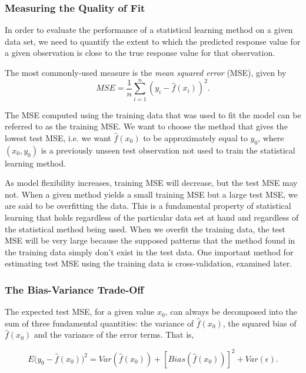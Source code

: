 \documentclass{article}
\numberwithin{equation}{section}
\begin{document}
\subsubsection{Measuring the Quality of Fit}
In order to evaluate the performance of a statistical learning method on a given data set, we need to quantify the extent to which the predicted response value for a given observation is close to the true response value for that observation.

The most commonly-used measure is the \textit{mean squared error} (MSE), given by
\begin{equation}
    MSE = \frac{1}{n} \sum_{i=1}^n (y_i - \hat f(x_i))^2.
\end{equation}

The MSE computed using the training data that was used to fit the model can be referred to as the training
MSE. We want to choose the method that gives
the lowest test MSE, i.e. we want $\hat f(x_0)$ to be approximately equal to $y_0$, where $(x_0, y_0)$ is a previously unseen test observation not used to train the statistical learning method.

As model flexibility increases, training MSE will decrease, but the test MSE may not. When a given method yields a small training MSE but a large test MSE, we are said to be overfitting the data. This is a fundamental property of statistical learning that holds regardless of the particular data set at hand and regardless of the statistical method being used. When we overfit
the training data, the test MSE will be very large because the supposed patterns that the method found in the training data simply don’t exist in the test data. One important method for estimating test MSE using the training data is cross-validation, examined later. 

\subsubsection{The Bias-Variance Trade-Off}

The expected test MSE, for a given value $x_0$, can always be decomposed into the sum of three fundamental quantities: the variance of $\hat f(x_0)$, the squared bias of $\hat f(x_0)$ and the variance of the error terms. That is,

\begin{equation}
    E \Big (y_0 - \hat f(x_0) \Big )^2 = Var( \hat f(x_0)) + [Bias( \hat f(x_0))]^2 + Var(\epsilon).
\end{equation}
\end{document}
